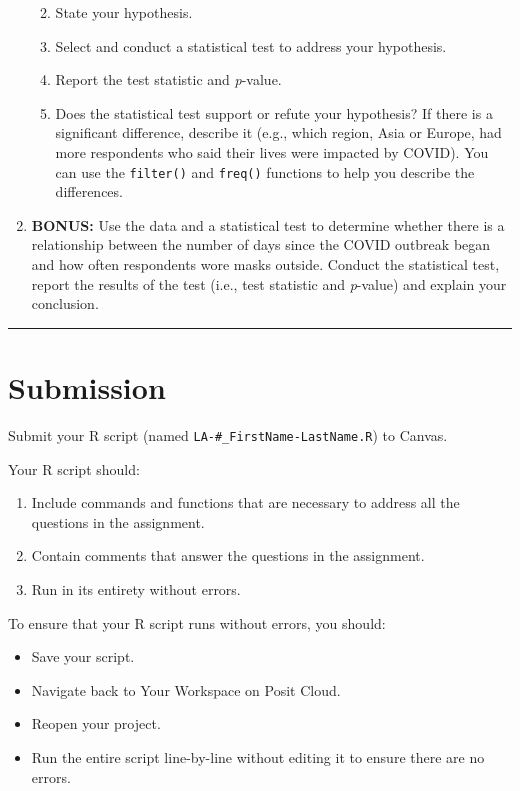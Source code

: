 \documentclass[
]{article}
\providecommand{\tightlist}{%
  \setlength{\itemsep}{0pt}\setlength{\parskip}{0pt}}\usepackage{longtable,booktabs,array}
\begin{document}
\begin{enumerate}
  \begin{enumerate}
  \def\labelenumii{\alph{enumii})}
  \tightlist
  \item
    State your hypothesis.
  \item
    Select and conduct a statistical test to address your hypothesis.
  \item
    Report the test statistic and \emph{p}-value.
  \item
    Does the statistical test support or refute your hypothesis? If
    there is a significant difference, describe it (e.g., which region,
    Asia or Europe, had more respondents who said their lives were
    impacted by COVID). You can use the \texttt{filter()} and
    \texttt{freq()} functions to help you describe the differences.
  \end{enumerate}
\item
  \textbf{BONUS:} Use the data and a statistical test to determine
  whether there is a relationship between the number of days since the
  COVID outbreak began and how often respondents wore masks outside.
  Conduct the statistical test, report the results of the test (i.e.,
  test statistic and \emph{p}-value) and explain your conclusion.
\end{enumerate}

\begin{center}\rule{0.5\linewidth}{0.5pt}\end{center}

\hypertarget{submission}{%
\section{Submission}\label{submission}}

Submit your R script (named \texttt{LA-\#\_FirstName-LastName.R}) to
Canvas.

Your R script should:

\begin{enumerate}
\def\labelenumi{\arabic{enumi})}
\tightlist
\item
  Include commands and functions that are necessary to address all the
  questions in the assignment.
\item
  Contain comments that answer the questions in the assignment.
\item
  Run in its entirety without errors.
\end{enumerate}

To ensure that your R script runs without errors, you should:

\begin{itemize}
\tightlist
\item
  Save your script.
\item
  Navigate back to Your Workspace on Posit Cloud.
\item
  Reopen your project.
\item
  Run the entire script line-by-line without editing it to ensure there
  are no errors.
\end{itemize}
\end{document}
